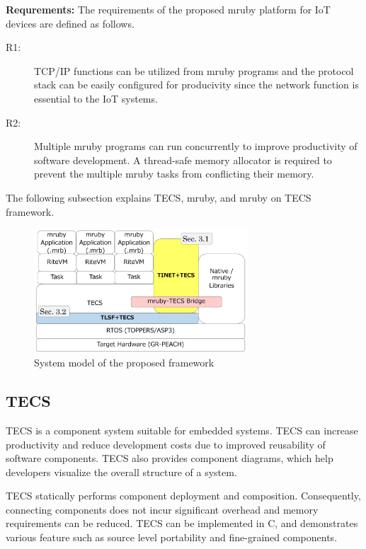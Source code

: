\documentclass[JIP]{ipsj_v2/UTF8/ipsj}
\begin{document}
{\bf Requrements:} The requirements of the proposed mruby platform for IoT devices are defined as follows.
\begin{description}
    \item[R1:]
        TCP/IP functions can be utilized from mruby programs and the protocol stack can be easily configured for producivity since the network function is essential to the IoT systems.

    \item[R2:]
        Multiple mruby programs can run concurrently to improve productivity of software development.
        A thread-safe memory allocator is required to prevent the multiple mruby tasks from conflicting their memory.

\end{description}
 
The following subsection explains TECS, mruby, and mruby on TECS framework.


\begin{figure}[t]
    \centering
    \includegraphics[width=8cm,clip]{figure/SystemModel.pdf}
    \caption{System model of the proposed framework}
    \label{fig:SystemModel}
\end{figure}

\subsection{TECS}
\label{sec:TECS}

TECS is a component system suitable for embedded systems.
TECS can increase productivity and reduce development costs due to improved reusability of software components.
TECS also provides component diagrams, which help developers visualize the overall structure of a system.

TECS statically performs component deployment and composition.
Consequently, connecting components does not incur significant overhead and memory requirements can be reduced.
TECS can be implemented in C, and demonstrates various feature such as source level portability and fine-grained components.
\end{document}
